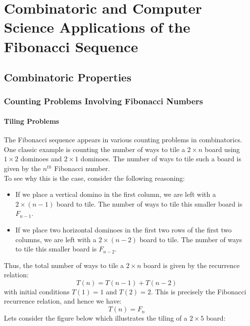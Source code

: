\documentclass[openany]{book}
\begin{document}
\chapter{Combinatoric and Computer Science Applications of the Fibonacci Sequence}
\section{Combinatoric Properties}
\subsection{Counting Problems Involving Fibonacci Numbers}
\subsubsection{Tiling Problems}
The Fibonacci sequence appears in various counting problems in combinatorics. One classic example is counting the number of ways to tile a $2 \times n$ board using $1 \times 2$ dominoes and $2 \times 1$ dominoes. The number of ways to tile such a board is given by the $n^{th}$ Fibonacci number. \\
To see why this is the case, consider the following reasoning:
\begin{itemize}
    \item If we place a vertical domino in the first column, we are left with a $2 \times (n-1)$ board to tile. The number of ways to tile this smaller board is $F_{n-1}$.
    \item If we place two horizontal dominoes in the first two rows of the first two columns, we are left with a $2 \times (n-2)$ board to tile. The number of ways to tile this smaller board is $F_{n-2}$.
\end{itemize}
Thus, the total number of ways to tile a $2 \times n$ board is given by the recurrence relation:
\[    T(n) = T(n-1) + T(n-2)
\]
with initial conditions $T(1) = 1$ and $T(2) = 2$. This is precisely the Fibonacci recurrence relation, and hence we have:
\[    T(n) = F_n
\]
Lets consider the figure below which illustrates the tiling of a $2 \times 5$ board:
\end{document}
